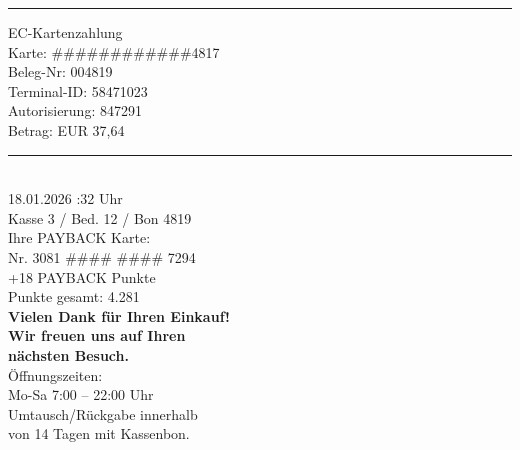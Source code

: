 \documentclass{article}
\begin{document}
\vspace{0.2cm}
\rule{70mm}{0.4pt}

{\centering\small
EC-Kartenzahlung\\
Karte: \#\#\#\#\#\#\#\#\#\#\#\#4817\\
Beleg-Nr: 004819\\
Terminal-ID: 58471023\\
Autorisierung: 847291\\
Betrag: EUR 37,64\\[0.2cm]
\rule{70mm}{0.4pt}\\[0.2cm]
18.01.2026 :32 Uhr\\
Kasse 3 / Bed. 12 / Bon 4819\\[0.2cm]
Ihre PAYBACK Karte:\\
Nr. 3081 \#\#\#\# \#\#\#\# 7294\\
+18 PAYBACK Punkte\\
Punkte gesamt: 4.281\\[0.3cm]
\textbf{Vielen Dank f\"ur Ihren Einkauf!}\\
\textbf{Wir freuen uns auf Ihren}\\
\textbf{n\"achsten Besuch.}\\[0.3cm]
\"Offnungszeiten:\\
Mo-Sa 7:00 -- 22:00 Uhr\\[0.5cm]
{\tiny Umtausch/R\"uckgabe innerhalb}\\
{\tiny von 14 Tagen mit Kassenbon.}\\
}
\end{document}
